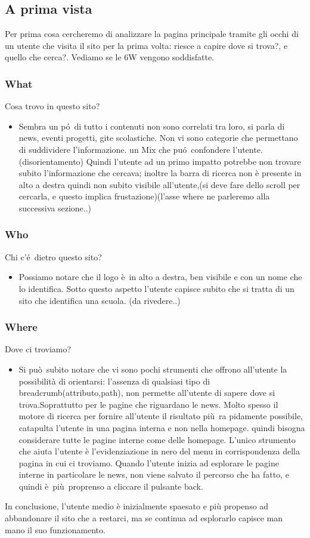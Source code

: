 \documentclass[12pt]{article}
\begin{document}
\subsection{A prima vista}
Per prima cosa cercheremo di analizzare la pagina principale tramite gli occhi di un utente che visita il sito per la prima volta: riesce a capire dove si trova?, e quello che cerca?. Vediamo se le 6W vengono soddisfatte.


\subsubsection{What} Cosa trovo in questo sito?
\begin{itemize}
	\item Sembra un p\'o\ di tutto i contenuti non sono correlati tra loro, si parla di news, eventi progetti, gite scolastiche. Non vi sono categorie che permettano di suddividere l'informazione. un Mix che pu\'o\ confondere l'utente.(disorientamento) Quindi l'utente ad un primo impatto potrebbe non trovare subito l'informazione che cercava; inoltre la barra di ricerca non è presente in alto a destra quindi non subito visibile all'utente,(si deve fare dello scroll per cercarla, e questo implica frustazione)(l'asse where ne parleremo alla successiva sezione..)
\end{itemize}
\subsubsection{Who} Chi c'\'e\ dietro questo sito?
\begin{itemize}
	\item Possiamo notare che il logo \`e\ in alto a destra, ben visibile e con un nome che lo identifica. Sotto questo aspetto l'utente capisce subito che si tratta di  un sito che identifica una scuola. (da rivedere..)
\end{itemize}
\subsubsection{Where} Dove ci troviamo?
\begin{itemize}
	\item Si pu\`o\ subito notare che vi sono pochi strumenti che offrono all'utente la possibilit\`a di orientarsi:
	l'assenza di qualsiasi tipo di breadcrumb(attributo,path), non permette all'utente
	di sapere dove si trova.Soprattutto per le pagine che riguardano le news. Molto spesso il motore di ricerca per fornire all'utente il risultato pi\`u\ ra pidamente possibile, catapulta l'utente in una pagina interna e non nella homepage. quindi bisogna considerare tutte le pagine interne come delle homepage.
	L'unico strumento che aiuta l'utente \`e l'evidenziazione in nero del menu in corrispondenza della pagina in cui ci troviamo.
	Quando l'utente inizia ad esplorare le pagine interne in particolare le news, non viene salvato il percorso che ha fatto, e quindi \`e\ pi\`u\ proprenso a cliccare il pulsante back.
\end{itemize}
In conclusione, l'utente medio \`e inizialmente spaesato e pi\`u propenso ad abbandonare il sito che a restarci, ma se continua ad esplorarlo capisce man mano il suo funzionamento.
\end{document}
